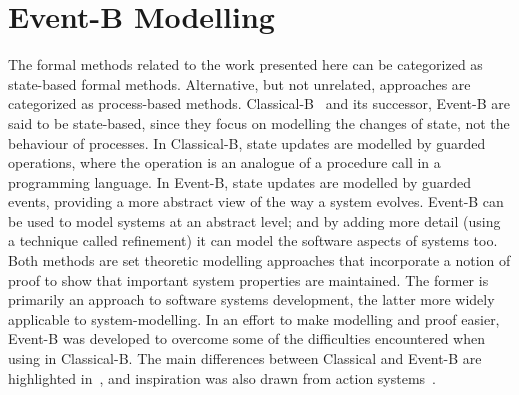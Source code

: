 \section{Event-B Modelling}\label{eventb}
The formal methods related to the work presented here can be categorized as state-based formal methods. Alternative, but not unrelated, approaches are categorized as process-based methods. Classical-B~\cite{TheBBook,CNP,B4Free,atelierB} and its successor, Event-B are said to be state-based, since they focus on modelling the changes of state, not the behaviour of processes. In Classical-B, state updates are modelled by guarded operations, where the operation is an analogue of a procedure call in a programming language. In Event-B, state updates are modelled by guarded events, providing a more abstract view of the way a system evolves. Event-B can be used to model systems at an abstract level; and by adding more detail (using a technique called refinement) it can model the software aspects of systems too. Both methods are set theoretic modelling approaches that incorporate a notion of proof to show that important system properties are maintained. The former is primarily an approach to software systems development, the latter more widely applicable to system-modelling. In an effort to make modelling and proof easier, Event-B was developed to overcome some of the difficulties encountered when using in Classical-B. The main differences between Classical and Event-B are highlighted in~\cite{Hallerstede07}, and inspiration was also drawn from action systems~\cite{Back1990133}.

